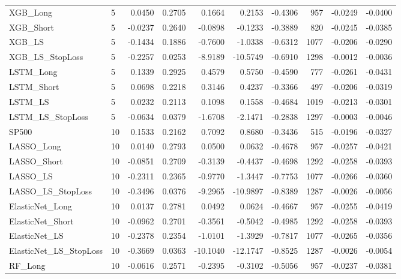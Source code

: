 \begin{tabular}{llrrrrrrrr}
\cline{1-10}
XGB\_Long & 5 & 0.0450 & 0.2705 & 0.1664 & 0.2153 & -0.4306 & 957 & -0.0249 & -0.0400 \\
\cline{1-10}
XGB\_Short & 5 & -0.0237 & 0.2640 & -0.0898 & -0.1233 & -0.3889 & 820 & -0.0245 & -0.0385 \\
\cline{1-10}
XGB\_LS & 5 & -0.1434 & 0.1886 & -0.7600 & -1.0338 & -0.6312 & 1077 & -0.0206 & -0.0290 \\
\cline{1-10}
XGB\_LS\_StopLoss & 5 & -0.2257 & 0.0253 & -8.9189 & -10.5749 & -0.6910 & 1298 & -0.0012 & -0.0036 \\
\cline{1-10}
LSTM\_Long & 5 & 0.1339 & 0.2925 & 0.4579 & 0.5750 & -0.4590 & 777 & -0.0261 & -0.0431 \\
\cline{1-10}
LSTM\_Short & 5 & 0.0698 & 0.2218 & 0.3146 & 0.4237 & -0.3366 & 497 & -0.0206 & -0.0319 \\
\cline{1-10}
LSTM\_LS & 5 & 0.0232 & 0.2113 & 0.1098 & 0.1558 & -0.4684 & 1019 & -0.0213 & -0.0301 \\
\cline{1-10}
LSTM\_LS\_StopLoss & 5 & -0.0634 & 0.0379 & -1.6708 & -2.1471 & -0.2838 & 1297 & -0.0003 & -0.0046 \\
\cline{1-10}
SP500 & 10 & 0.1533 & 0.2162 & 0.7092 & 0.8680 & -0.3436 & 515 & -0.0196 & -0.0327 \\
\cline{1-10}
LASSO\_Long & 10 & 0.0140 & 0.2793 & 0.0500 & 0.0632 & -0.4678 & 957 & -0.0257 & -0.0421 \\
\cline{1-10}
LASSO\_Short & 10 & -0.0851 & 0.2709 & -0.3139 & -0.4437 & -0.4698 & 1292 & -0.0258 & -0.0393 \\
\cline{1-10}
LASSO\_LS & 10 & -0.2311 & 0.2365 & -0.9770 & -1.3447 & -0.7753 & 1077 & -0.0266 & -0.0360 \\
\cline{1-10}
LASSO\_LS\_StopLoss & 10 & -0.3496 & 0.0376 & -9.2965 & -10.9897 & -0.8389 & 1287 & -0.0026 & -0.0056 \\
\cline{1-10}
ElasticNet\_Long & 10 & 0.0137 & 0.2781 & 0.0492 & 0.0624 & -0.4667 & 957 & -0.0255 & -0.0419 \\
\cline{1-10}
ElasticNet\_Short & 10 & -0.0962 & 0.2701 & -0.3561 & -0.5042 & -0.4985 & 1292 & -0.0258 & -0.0393 \\
\cline{1-10}
ElasticNet\_LS & 10 & -0.2378 & 0.2354 & -1.0101 & -1.3929 & -0.7817 & 1077 & -0.0265 & -0.0356 \\
\cline{1-10}
ElasticNet\_LS\_StopLoss & 10 & -0.3669 & 0.0363 & -10.1040 & -12.1747 & -0.8525 & 1287 & -0.0026 & -0.0054 \\
\cline{1-10}
RF\_Long & 10 & -0.0616 & 0.2571 & -0.2395 & -0.3102 & -0.5056 & 957 & -0.0237 & -0.0381 \\

\end{tabular}
